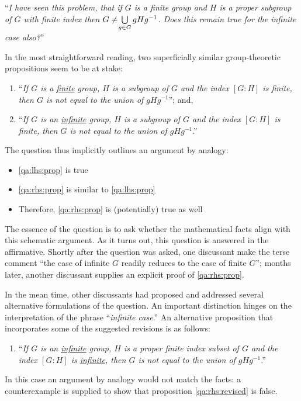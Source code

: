 \documentclass[smallextended,oneside]{svjour3}       %
\newcounter{turn}
\begin{document}
\medskip

\noindent ``\emph{I have seen this problem, that if $G$ is a finite group and $H$ is a
  proper subgroup of $G$ with finite index then $ G \neq\hspace{-.2em}\bigcup\limits_{g \in G} gHg^{-1}$. Does this remain true for the
  infinite case also?}''

\noindent 
In the most straightforward reading, two superficially similar group-theoretic propositions seem
to be at stake:
\begin{enumerate}[label=(\emph{P\arabic*}),ref=(\emph{P\arabic*}),leftmargin=1cm]
\item ``\emph{If $G$ is a \uline{finite} group, $H$ is a subgroup of $G$ and the
  index $[G \mathop{:} H]$ is finite, then $G$ is not equal to the
  union of $gHg^{-1}$}''; and, \label{qa:lhs:prop}
\item ``\emph{If $G$ is an \uline{infinite} group, $H$ is a subgroup of $G$
  and the index $[G \mathop{:} H]$ is finite, then $G$ is not equal to
  the union of $gHg^{-1}$}.'' \label{qa:rhs:prop}
\end{enumerate}
The question thus implicitly outlines an argument by analogy:
\begin{itemize}
\item \ref{qa:lhs:prop} is true
\item \ref{qa:rhs:prop} is similar to \ref{qa:lhs:prop}
\item Therefore, \ref{qa:rhs:prop} is (potentially) true as well
\end{itemize} 
The essence of the question is to ask whether the mathematical facts
align with this schematic argument.
As it turns out, this question is answered in the affirmative.
Shortly after the question was asked, one discussant make the terse
comment ``the case of infinite $G$ readily reduces to the case of
finite $G$''; months later, another discussant supplies an explicit
proof of \ref{qa:rhs:prop}.

In the mean time, other discussants had proposed and addressed several
alternative formulations of the question.  An important distinction hinges on the
interpretation of the phrase ``\emph{infinite case}.''
An alternative proposition that incorporates some of the suggested
revisions is as follows:
\begin{enumerate}[start=2,label=(\emph{P\arabic*}$^\prime$),ref=(\emph{P\arabic*}$^\prime$),leftmargin=1cm]
\item ``\emph{If $G$ is an \uline{infinite} group, $H$ is a proper finite index subset of $G$
  and the index $[G \mathop{:} H]$ is \uline{infinite}, then $G$ is not equal to
  the union of $gHg^{-1}$}.'' \label{qa:rhs:revised}
\end{enumerate}
In this case an argument by analogy would not match the facts:
a counterexample is supplied to show that proposition \ref{qa:rhs:revised} is false.
\end{document}
